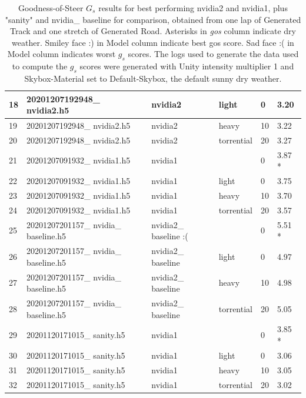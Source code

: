 \begin{table}[]
\begin{center}
\begin{tabular}{|l|l|l|l|l|l|}
18 & 20201207192948\_ nvidia2.h5 & nvidia2 & light & 0 & 3.20 \\ \hline
19 & 20201207192948\_ nvidia2.h5 & nvidia2 & heavy & 10 & 3.22 \\ \hline
20 & 20201207192948\_ nvidia2.h5 & nvidia2 & torrential & 20 & 3.27 \\ \hline
21 & 20201207091932\_ nvidia1.h5 & nvidia1 &  & 0 & 3.87 * \\ \hline
22 & 20201207091932\_ nvidia1.h5 & nvidia1 & light & 0 & 3.75 \\ \hline
23 & 20201207091932\_ nvidia1.h5 & nvidia1 & heavy & 10 & 3.70 \\ \hline
24 & 20201207091932\_ nvidia1.h5 & nvidia1 & torrential & 20 & 3.57 \\ \hline
25 & 20201207201157\_ nvidia\_ baseline.h5 & nvidia2\_ baseline :( &  & 0 & 5.51 * \\ \hline
26 & 20201207201157\_ nvidia\_ baseline.h5 & nvidia2\_ baseline & light & 0 & 4.97 \\ \hline
27 & 20201207201157\_ nvidia\_ baseline.h5 & nvidia2\_ baseline & heavy & 10 & 4.98 \\ \hline
28 & 20201207201157\_ nvidia\_ baseline.h5 & nvidia2\_ baseline & torrential & 20 & 5.05 \\ \hline
29 & 20201120171015\_ sanity.h5 & nvidia1 &  & 0 & 3.85 * \\ \hline
30 & 20201120171015\_ sanity.h5 & nvidia1 & light & 0 & 3.06 \\ \hline
31 & 20201120171015\_ sanity.h5 & nvidia1 & heavy & 10 & 3.05 \\ \hline
32 & 20201120171015\_ sanity.h5 & nvidia1 & torrential & 20 & 3.02 \\ \hline
\end{tabular}
\end{center}
\caption{Goodness-of-Steer $G_s$ results for best performing nvidia2 and nvidia1, plus "sanity" and nvidia\_ baseline for comparison, obtained from one lap of Generated Track and one stretch of Generated Road. Asterisks in \textit{gos} column indicate dry weather. Smiley face :) in Model column indicate best gos score. Sad face :( in Model column indicates worst $g_s$ scores. The logs used to generate the data used to compute the $g_s$ scores were generated with Unity intensity multiplier 1 and Skybox-Material set to Default-Skybox, the default sunny dry weather.}
\label{table:goodness-of-steer}
\end{table}
